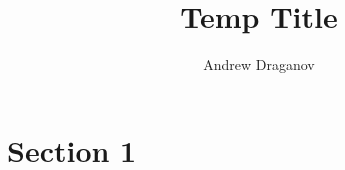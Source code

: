 \documentclass{article}
\title{Temp Title}
\author{Andrew Draganov}
\theoremstyle{definition}
\begin{document}
\maketitle

\section{Section 1}

\printbibliography
\end{document}
